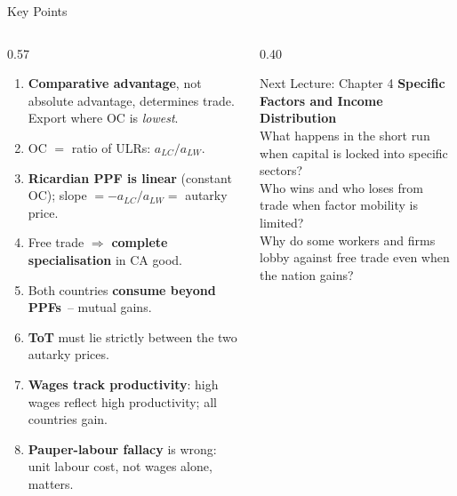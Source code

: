 \documentclass[aspectratio=169]{beamer}
\begin{document}
\begin{frame}{Key Points}
\begin{columns}[T]
\begin{column}{0.57\textwidth}
\begin{enumerate}\small
  \item \textbf{Comparative advantage}, not absolute
        advantage, determines trade.  Export where OC
        is \emph{lowest}.
  \item OC $=$ ratio of ULRs: $a_{LC}/a_{LW}$.
  \item \textbf{Ricardian PPF is linear} (constant OC);
        slope $= -a_{LC}/a_{LW} =$ autarky price.
  \item Free trade $\Rightarrow$
        \textbf{complete specialisation} in CA good.
  \item Both countries \textbf{consume beyond PPFs}~--
        mutual gains.
  \item \textbf{ToT} must lie strictly between the two
        autarky prices.
  \item \textbf{Wages track productivity}: high wages
        reflect high productivity; all countries gain.
  \item \textbf{Pauper-labour fallacy} is wrong:
        unit labour cost, not wages alone, matters.
\end{enumerate}
\end{column}
\begin{column}{0.40\textwidth}
\begin{block}{Next Lecture: Chapter 4}
\textbf{Specific Factors and Income Distribution}\\[0.3em]
\small What happens in the short run when capital is
locked into specific sectors?\\[0.2em]
Who wins and who loses from trade when factor mobility
is limited?\\[0.2em]
Why do some workers and firms lobby against free trade
even when the nation gains?
\end{block}
\end{column}
\end{columns}
\end{frame}
\end{document}
